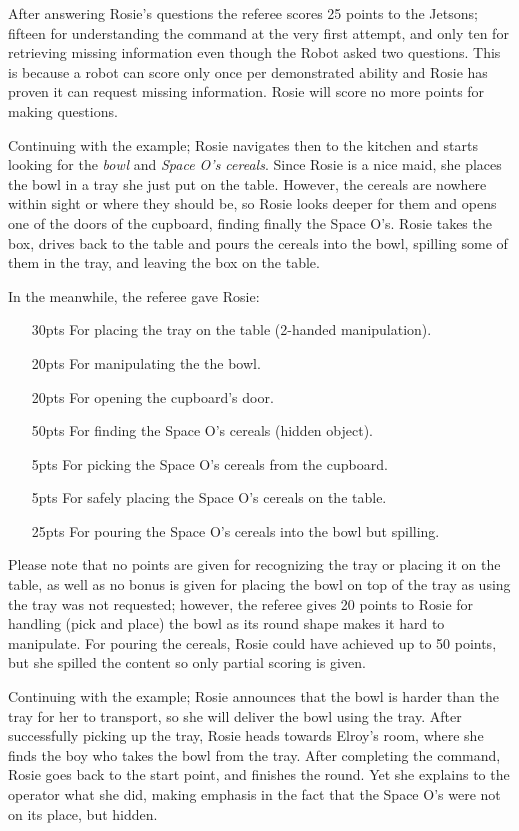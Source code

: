 After answering Rosie's questions the referee scores 25 points to the Jetsons; fifteen for understanding the command at the very first attempt, and only ten for retrieving missing information even though the Robot asked two questions. This is because a robot can score only once per demonstrated ability and Rosie has proven it can request missing information. Rosie will score no more points for making questions.

Continuing with the example; Rosie navigates then to the kitchen and starts looking for the \textit{bowl} and \textit{Space O's cereals}. Since Rosie is a nice maid, she places the bowl in a tray she just put on the table. However, the cereals are nowhere within sight or where they should be, so Rosie looks deeper for them and opens one of the doors of the cupboard, finding finally the Space O's. Rosie takes the box, drives back to the table and pours the cereals into the bowl, spilling some of them in the tray, and leaving the box on the table.

In the meanwhile, the referee gave Rosie:
\begin{itemize}
	\item[30pts] For placing the tray on the table (2-handed manipulation).
	\item[20pts] For manipulating the the bowl.
	\item[20pts] For opening the cupboard's door.
	\item[50pts] For finding the Space O's cereals (hidden object).
	\item[ 5pts] For picking the Space O's cereals from the cupboard.
	\item[ 5pts] For safely placing the Space O's cereals on the table.
	\item[25pts] For pouring the Space O's cereals into the bowl but spilling.
\end{itemize}

Please note that no points are given for recognizing the tray or placing it on the table, as well as no bonus is given for placing the bowl on top of the tray as using the tray was not requested; however, the referee gives 20 points to Rosie for handling (pick and place) the bowl as its round shape makes it hard to manipulate. For pouring the cereals, Rosie could have achieved up to 50 points, but she spilled the content so only partial scoring is given. 

Continuing with the example; Rosie announces that the bowl is harder than the tray for her to transport, so she will deliver the bowl using the tray. After successfully picking up the tray, Rosie heads towards Elroy's room, where she finds the boy who takes the bowl from the tray. After completing the command, Rosie goes back to the start point, and finishes the round. Yet she explains to the operator what she did, making emphasis in the fact that the Space O's were not on its place, but hidden.

